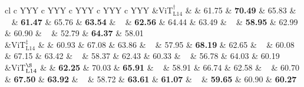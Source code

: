 \begin{table}[bp]
\begin{tabularx}{\textwidth}{cl c YYY c YYY c YYY c YYY c YYY}
&{ViT$_{\text{L14}}^\dag$} &  & 
61.75 & \textbf{70.49} & 65.83  &  ~ &
 \textbf{61.47} &  65.76 &  \textbf{63.54}  & ~ &
\textbf{62.56} & 64.44 & 63.49  & ~ &
\textbf{58.95} & 62.99 & 60.90  & ~ &
52.79 & \textbf{64.37} & 58.01  \\

&{ViT$_{\text{L14}}^\ddag$} &  & 
60.93 & 67.08 & 63.86  & ~ &
57.95 & \textbf{68.19} & 62.65  & ~ &
60.08 & 67.15 & 63.42  & ~ &
58.37 & 62.43 & 60.33  & ~ &
56.78 & 64.03 & 60.19  \\

&{ViT$_{\text{L14}}^\S$} &  & 
 \textbf{62.25} &  70.03 &  \textbf{65.91}  & ~ &
58.91 & 66.74 & 62.58  &  ~ &
 60.70 &  \textbf{67.50} &  \textbf{63.92}  &  ~ &
 58.72 &  \textbf{63.61} &  \textbf{61.07}  &  ~ &
 \textbf{59.65} &  60.90 &  \textbf{60.27}  \\


\midrule






\end{tabularx}
\end{table}
